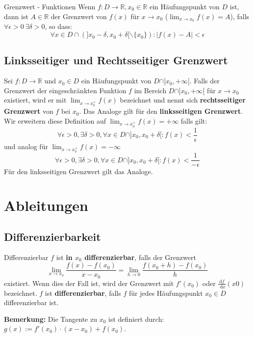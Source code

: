 \documentclass[a4paper,8pt]{extarticle}
\newenvironment{bemerkung}{
   \noindent \textbf{Bemerkung:  }}{}
\def\R{\mathbb{R}}
\def\dx{\text{ d}x}
\begin{document}
\begin{mainbox}{Grenzwert - Funktionen}
 Wenn $f: D \to \R, x_0 \in \R$ ein Häufungspunkt von $D$ ist, dann ist $A \in \R$ der Grenzwert von $f(x)$ für $x \to x_0$ ($\lim_{x\to x_0} f(x) = A$), falls $\forall \epsilon > 0 \ \exists \delta > 0$, so dass: $$\forall x \in D \cap (]x_0 - \delta, x_0 + \delta[ \backslash \{x_0\}): |f(x) - A| < \epsilon$$
\end{mainbox}

\subsection{Linksseitiger und Rechtsseitiger Grenzwert}
Sei $f: D \to \R$ und $x_0 \in D$ ein Häufungspunkt von $D \cap ]x_0, +\infty[$. Falls der Grenzwert der eingeschränkten Funktion $f$ im Bereich $D \cap ]x_0, +\infty[$ für $x \to x_0$ existiert, wird er mit $\lim_{x\to x_0^+}f(x)$ bezeichnet und nennt sich \textbf{rechtsseitiger Grenzwert} von $f$ bei $x_0$. Das Analoge gilt für den \textbf{linksseitigen Grenzwert}. \\
Wir erweitern diese Definition auf $\lim_{x\to x_0^+}f(x) = + \infty$ falls gilt: $$\forall \epsilon > 0, \exists \delta > 0, \forall x \in D \cap ]x_0, x_0 + \delta[: f(x) < \frac{1}{\epsilon}$$
und analog für $\lim_{x\to x_0^+}f(x) = - \infty$ $$\forall \epsilon > 0, \exists \delta > 0, \forall x \in D \cap ]x_0, x_0 + \delta[: f(x) < \frac{1}{-\epsilon}$$
Für den linksseitigen Grenzwert gilt das Analoge.

\section{Ableitungen}
\subsection{Differenzierbarkeit}
\begin{mainbox}{Differenzierbar}
 $f$ ist \textbf{in $x_0$ differenzierbar}, falls der Grenzwert $$\lim_{x\to x_0} \frac{f(x) - f(x_0)}{x - x_0} = \lim_{h \to 0} \frac{f(x_0 + h) - f(x_0)}{h}$$ existiert. Wenn dies der Fall ist, wird der Grenzwert mit $f'(x_0)$ oder $\frac{\text{d}f}{\dx}(x0)$ bezeichnet. $f$ ist \textbf{differenzierbar}, falls $f$ für jedes Häufungspunkt $x_0 \in D$ differenzierbar ist.
\end{mainbox}

\begin{bemerkung}
  Die Tangente zu $x_0$ ist definiert durch: $g(x) := f'(x_0) \cdot (x - x_0) + f(x_0)$.
\end{bemerkung}
\end{document}
